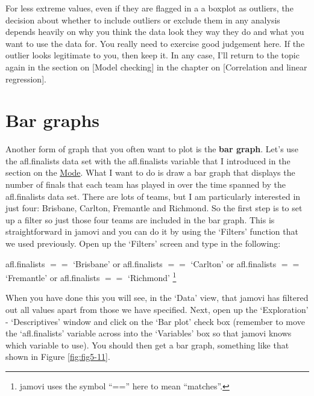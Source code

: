 \documentclass[
]{book}
\begin{document}
For less extreme values, even if they are flagged in a a boxplot as outliers, the decision about whether to include outliers or exclude them in any analysis depends heavily on why you think the data look they way they do and what you want to use the data for. You really need to exercise good judgement here. If the outlier looks legitimate to you, then keep it. In any case, I'll return to the topic again in the section on {[}Model checking{]} in the chapter on {[}Correlation and linear regression{]}.

\hypertarget{bar-graphs}{%
\section{Bar graphs}\label{bar-graphs}}

Another form of graph that you often want to plot is the \textbf{bar graph}. Let's use the afl.finalists data set with the afl.finalists variable that I introduced in the section on the \protect\hyperlink{mode}{Mode}. What I want to do is draw a bar graph that displays the number of finals that each team has played in over the time spanned by the afl.finalists data set. There are lots of teams, but I am particularly interested in just four: Brisbane, Carlton, Fremantle and Richmond. So the first step is to set up a filter so just those four teams are included in the bar graph. This is straightforward in jamovi and you can do it by using the `Filters' function that we used previously. Open up the `Filters' screen and type in the following:

afl.finalists \(==\) `Brisbane' or afl.finalists \(==\) `Carlton' or afl.finalists \(==\) `Fremantle' or afl.finalists \(==\) `Richmond' \footnote{jamovi uses the symbol ``=='' here to mean ``matches''.}

When you have done this you will see, in the `Data' view, that jamovi has filtered out all values apart from those we have specified. Next, open up the `Exploration' - `Descriptives' window and click on the `Bar plot' check box (remember to move the `afl.finalists' variable across into the `Variables' box so that jamovi knows which variable to use). You should then get a bar graph, something like that shown in Figure \ref{fig:fig5-11}.
\end{document}
